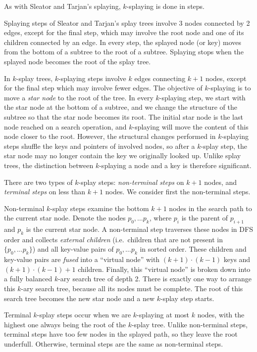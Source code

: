 As with Sleator and Tarjan's splaying, $k$-splaying is done in steps.

Splaying steps of Sleator and Tarjan's splay trees involve 3 nodes connected
by 2 edges, except for the final step, which may involve the root node and one
of its children connected by an edge. In every step, the splayed node (or key)
moves from the bottom of a subtree to the root of a subtree.
Splaying stops when the splayed node becomes the root of the splay tree.

In $k$-splay trees, $k$-splaying steps involve $k$ edges connecting
$k+1$ nodes, except for the final step which may involve fewer edges.
The objective of $k$-splaying is to move a \emph{star node} to the
root of the tree. In every $k$-splaying step, we start with the star node
at the bottom of a subtree, and we change the structure of the subtree
so that the star node becomes its root.
The initial star node is the last node reached on a search operation, and
$k$-splaying will move the content of this node closer to the root.
However, the structural changes performed in $k$-splaying steps shuffle
the keys and pointers of involved nodes, so after a $k$-splay step,
the star node may no longer contain the key we originally looked up.
Unlike splay trees, the distinction between $k$-splaying a node and a key
is therefore significant.

There are two types of $k$-splay steps: \emph{non-terminal steps} on
$k+1$ nodes, and \emph{terminal steps} on less than $k+1$ nodes.
We consider first the non-terminal steps.

Non-terminal $k$-splay steps examine the bottom $k+1$ nodes in the search
path to the current star node. Denote the nodes $p_0,\ldots p_{k}$, where $p_i$
is the parent of $p_{i+1}$ and $p_k$ is the current star node. A non-terminal
step traverses these nodes in DFS order and collects \emph{external children}
(i.e.\ children that are not present in $\{p_0,\ldots p_k\}$) and all key-value
pairs of $p_0,\ldots p_k$ in sorted order. These children and key-value pairs
are \emph{fused} into a ``virtual node'' with $(k+1)\cdot (k-1)$ keys and
$(k+1)\cdot(k-1) + 1$ children. Finally, this ``virtual node'' is broken down
into a fully balanced $k$-ary search tree of depth 2. There is exactly one
way to arrange this $k$-ary search tree, because all its nodes must be complete.
The root of this search tree becomes the new star node and a new $k$-splay
step starts.

Terminal $k$-splay steps occur when we are $k$-splaying at most $k$
nodes, with the highest one always being the root of the $k$-splay tree.
Unlike non-terminal steps, terminal steps have too few nodes in the splayed
path, so they leave the root underfull. Otherwise, terminal steps are the same
as non-terminal steps.

